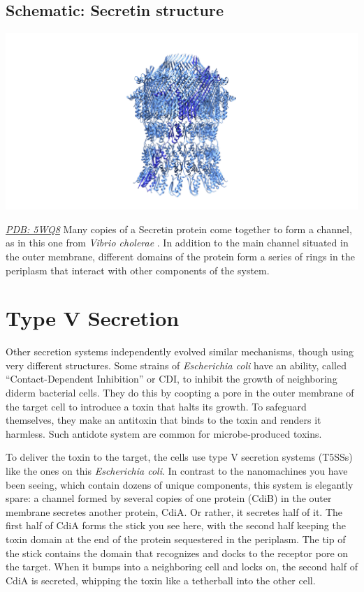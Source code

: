 \documentclass[]{tufte-book}
\begin{document}
\hypertarget{Secretin_structure}{\subsection*{Schematic: Secretin
structure}\label{Secretin_structure}}

\includegraphics{img/schematics/9_4_2}

\href{http://rcsb.org/structure/5WQ8}{\emph{PDB: 5WQ8}} Many copies of a
Secretin protein come together to form a channel, as in this one from
\emph{Vibrio cholerae} \citep{yan2017a}. In addition to the main channel
situated in the outer membrane, different domains of the protein form a
series of rings in the periplasm that interact with other components of
the system.

\section{Type V Secretion}\label{type-v-secretion}

Other secretion systems independently evolved similar mechanisms, though
using very different structures. Some strains of \emph{Escherichia coli}
have an ability, called ``Contact-Dependent Inhibition'' or CDI, to
inhibit the growth of neighboring diderm bacterial cells. They do this
by coopting a pore in the outer membrane of the target cell to introduce
a toxin that halts its growth. To safeguard themselves, they make an
antitoxin that binds to the toxin and renders it harmless. Such antidote
system are common for microbe-produced toxins.

To deliver the toxin to the target, the cells use type V secretion
systems (T5SSs) like the ones on this \emph{Escherichia coli}. In
contrast to the nanomachines you have been seeing, which contain dozens
of unique components, this system is elegantly spare: a channel formed
by several copies of one protein (CdiB) in the outer membrane secretes
another protein, CdiA. Or rather, it secretes half of it. The first half
of CdiA forms the stick you see here, with the second half keeping the
toxin domain at the end of the protein sequestered in the periplasm. The
tip of the stick contains the domain that recognizes and docks to the
receptor pore on the target. When it bumps into a neighboring cell and
locks on, the second half of CdiA is secreted, whipping the toxin like a
tetherball into the other cell.
\end{document}
